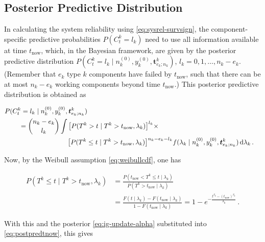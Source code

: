 \documentclass[Journal,letterpaper]{ascelike-new}
\newcommand{\dd}{\,\mathrm{d}}
\renewcommand{\vec}[1]{{\bm#1}}
\newcommand{\uz}{^{(0)}} %
\def\ykz{y\uz_k}
\def\nkz{n\uz_k}
\def\tnow{t_\text{now}}
\begin{document}
\subsection{Posterior Predictive Distribution}
\label{sec:postpred}

In calculating the system reliability using \eqref{eq:sysrel-survsign},
the component-specific predictive probabilities $P(C^k_t = l_k)$
need to use all information available at time $\tnow$,
which, in the Bayesian framework,
are given by the posterior predictive distribution 
$P(C^k_t = l_k\mid\nkz,\ykz, \vec{t}^k_{e_k;n_k})$, $l_k = 0, 1, \ldots, n_k-e_k$. %
(Remember that $e_k$ type $k$ components have failed by $\tnow$,
such that there can be at most $n_k-e_k$ working components beyond time $\tnow$.)
This posterior predictive distribution is obtained as
\begin{linenomath*}
\begin{align}
\lefteqn{%
P(C^k_t = l_k\mid\nkz,\ykz, \vec{t}^k_{e_k;n_k})}\hspace*{5ex} \nonumber\\  %
 &= \binom{n_k - e_k}{l_k} \int \big[P(T^k >    t \mid T^k > \tnow, \lambda_k)\big]^{l_k} \times \nonumber\\ & \hspace*{17ex}
                                  \big[P(T^k \leq t \mid T^k > \tnow, \lambda_k)\big]^{n_k - e_k - l_k}
    f(\lambda_k\mid\nkz,\ykz,\vec{t}^k_{e_k;n_k}) \dd \lambda_k\,.
\label{eq:postpredtnow}
\end{align}
\end{linenomath*}
%
Now, by the Weibull assumption \eqref{eq:weibullcdf}, one has
\begin{linenomath*}
\begin{align}
P(T^k \leq t \mid T^k > \tnow, \lambda_k)
 &= \frac{P(\tnow < T^k \leq t \mid\lambda_k)}{P(T^k > \tnow \mid \lambda_k)} \nonumber\\
 &= \frac{F(t\mid\lambda_k) - F(\tnow\mid\lambda_k)}{1-F(\tnow\mid\lambda_k)} 
  = 1 - e^{-\frac{t^{\beta_k} - (\tnow)^{\beta_k}}{\lambda_k}}\,.
\end{align}
\end{linenomath*}
%
With this and the posterior \eqref{eq:ig-update-alpha} substituted into \eqref{eq:postpredtnow}, this gives
\end{document}

